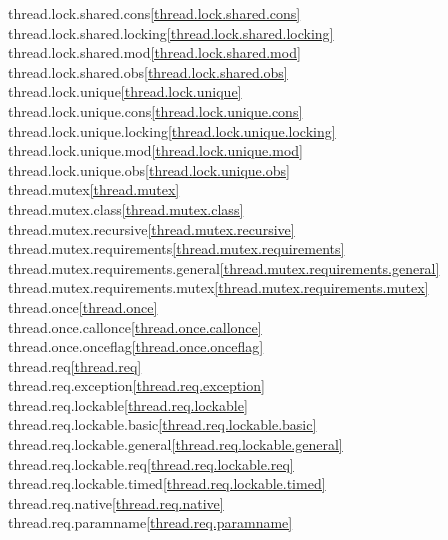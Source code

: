 \begin{multicols}{2}
thread.lock.shared.cons\quad\ref{thread.lock.shared.cons}\\
thread.lock.shared.locking\quad\ref{thread.lock.shared.locking}\\
thread.lock.shared.mod\quad\ref{thread.lock.shared.mod}\\
thread.lock.shared.obs\quad\ref{thread.lock.shared.obs}\\
thread.lock.unique\quad\ref{thread.lock.unique}\\
thread.lock.unique.cons\quad\ref{thread.lock.unique.cons}\\
thread.lock.unique.locking\quad\ref{thread.lock.unique.locking}\\
thread.lock.unique.mod\quad\ref{thread.lock.unique.mod}\\
thread.lock.unique.obs\quad\ref{thread.lock.unique.obs}\\
thread.mutex\quad\ref{thread.mutex}\\
thread.mutex.class\quad\ref{thread.mutex.class}\\
thread.mutex.recursive\quad\ref{thread.mutex.recursive}\\
thread.mutex.requirements\quad\ref{thread.mutex.requirements}\\
thread.mutex.requirements.general\quad\ref{thread.mutex.requirements.general}\\
thread.mutex.requirements.mutex\quad\ref{thread.mutex.requirements.mutex}\\
thread.once\quad\ref{thread.once}\\
thread.once.callonce\quad\ref{thread.once.callonce}\\
thread.once.onceflag\quad\ref{thread.once.onceflag}\\
thread.req\quad\ref{thread.req}\\
thread.req.exception\quad\ref{thread.req.exception}\\
thread.req.lockable\quad\ref{thread.req.lockable}\\
thread.req.lockable.basic\quad\ref{thread.req.lockable.basic}\\
thread.req.lockable.general\quad\ref{thread.req.lockable.general}\\
thread.req.lockable.req\quad\ref{thread.req.lockable.req}\\
thread.req.lockable.timed\quad\ref{thread.req.lockable.timed}\\
thread.req.native\quad\ref{thread.req.native}\\
thread.req.paramname\quad\ref{thread.req.paramname}\\

\end{multicols}
